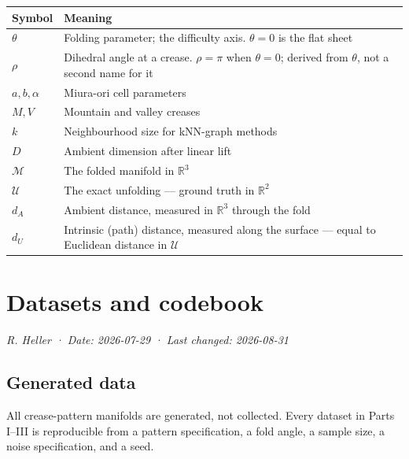 \documentclass[
  british,
  a4paper,
]{book}
\newcounter{none} %
\begin{document}
{\def\LTcaptype{none} %
\begin{longtable}[]{@{}
  >{\raggedright\arraybackslash}p{}
  >{\raggedright\arraybackslash}p{}@{}}
\toprule\noalign{}
\begin{minipage}[b]{\linewidth}\raggedright
Symbol
\end{minipage} & \begin{minipage}[b]{\linewidth}\raggedright
Meaning
\end{minipage} \\
\midrule\noalign{}
\endhead
\bottomrule\noalign{}
\endlastfoot
\(\theta\) & Folding parameter; the difficulty axis. \(\theta = 0\) is the flat sheet \\
\(\rho\) & Dihedral angle at a crease. \(\rho = \pi\) when \(\theta = 0\); derived from \(\theta\), not a second name for it \\
\(a, b, \alpha\) & Miura-ori cell parameters \\
\(M, V\) & Mountain and valley creases \\
\(k\) & Neighbourhood size for kNN-graph methods \\
\(D\) & Ambient dimension after linear lift \\
\(\mathcal{M}\) & The folded manifold in \(\mathbb{R}^3\) \\
\(\mathcal{U}\) & The exact unfolding --- ground truth in \(\mathbb{R}^2\) \\
\(d_A\) & Ambient distance, measured in \(\mathbb{R}^3\) through the fold \\
\(d_U\) & Intrinsic (path) distance, measured along the surface --- equal to Euclidean distance in \(\mathcal{U}\) \\
\end{longtable}
}

\chapter{Datasets and codebook}\label{datasets}

\emph{R. Heller · Date: 2026-07-29 · Last changed: 2026-08-31}

\section*{Generated data}\label{datasets-generated}

All crease-pattern manifolds are generated, not collected. Every dataset in
Parts I--III is reproducible from a pattern specification, a fold angle, a
sample size, a noise specification, and a seed.
\end{document}

